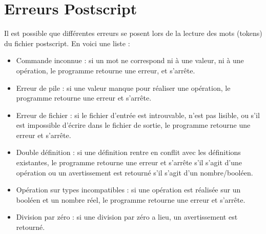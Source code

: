 \documentclass[11pt,a4paper]{article}
\begin{document}
\section{Erreurs Postscript}
Il est possible que différentes erreurs se posent lors de la lecture des mots (tokens) du fichier postscript. En voici une liste :
\begin{itemize}
\item Commande inconnue : si un mot ne correspond ni à une valeur, ni à une opération, le programme retourne une erreur, et s'arrête.
\item Erreur de pile : si une valeur manque pour réaliser une opération, le programme retourne une erreur et s'arrête.
\item Erreur de fichier : si le fichier d'entrée est introuvable, n'est pas lisible, ou s'il est impossible d'écrire dans le fichier de sortie, le programme retourne une erreur et s'arrête.
\item Double définition : si une définition rentre en conflit avec les définitions existantes, le programme retourne une erreur et s'arrête s'il s'agit d'une opération ou un avertissement est retourné s'il s'agit d'un nombre/booléen.
\item Opération sur types incompatibles : si une opération est réalisée sur un booléen et un nombre réel, le programme retourne une erreur et s'arrête.
\item Division par zéro : si une division par zéro a lieu, un avertissement est retourné.
\end{itemize}
\end{document}

